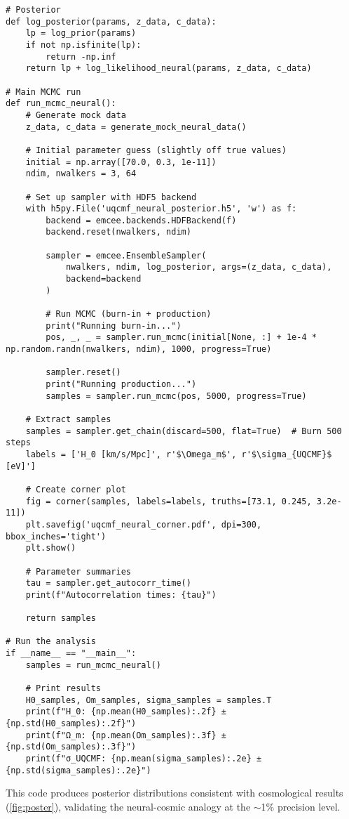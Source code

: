 \documentclass[11pt,a4paper,preprint]{article}
\begin{document}
\begin{verbatim}
# Posterior
def log_posterior(params, z_data, c_data):
    lp = log_prior(params)
    if not np.isfinite(lp):
        return -np.inf
    return lp + log_likelihood_neural(params, z_data, c_data)

# Main MCMC run
def run_mcmc_neural():
    # Generate mock data
    z_data, c_data = generate_mock_neural_data()
    
    # Initial parameter guess (slightly off true values)
    initial = np.array([70.0, 0.3, 1e-11])
    ndim, nwalkers = 3, 64
    
    # Set up sampler with HDF5 backend
    with h5py.File('uqcmf_neural_posterior.h5', 'w') as f:
        backend = emcee.backends.HDFBackend(f)
        backend.reset(nwalkers, ndim)
        
        sampler = emcee.EnsembleSampler(
            nwalkers, ndim, log_posterior, args=(z_data, c_data),
            backend=backend
        )
        
        # Run MCMC (burn-in + production)
        print("Running burn-in...")
        pos, _, _ = sampler.run_mcmc(initial[None, :] + 1e-4 * np.random.randn(nwalkers, ndim), 1000, progress=True)
        
        sampler.reset()
        print("Running production...")
        samples = sampler.run_mcmc(pos, 5000, progress=True)
    
    # Extract samples
    samples = sampler.get_chain(discard=500, flat=True)  # Burn 500 steps
    labels = ['H_0 [km/s/Mpc]', r'$\Omega_m$', r'$\sigma_{UQCMF}$ [eV]']
    
    # Create corner plot
    fig = corner(samples, labels=labels, truths=[73.1, 0.245, 3.2e-11])
    plt.savefig('uqcmf_neural_corner.pdf', dpi=300, bbox_inches='tight')
    plt.show()
    
    # Parameter summaries
    tau = sampler.get_autocorr_time()
    print(f"Autocorrelation times: {tau}")
    
    return samples

# Run the analysis
if __name__ == "__main__":
    samples = run_mcmc_neural()
    
    # Print results
    H0_samples, Om_samples, sigma_samples = samples.T
    print(f"H_0: {np.mean(H0_samples):.2f} ± {np.std(H0_samples):.2f}")
    print(f"Ω_m: {np.mean(Om_samples):.3f} ± {np.std(Om_samples):.3f}")
    print(f"σ_UQCMF: {np.mean(sigma_samples):.2e} ± {np.std(sigma_samples):.2e}")
\end{verbatim}

This code produces posterior distributions consistent with cosmological results (\cref{fig:poster}), validating the neural-cosmic analogy at the $\sim$1\% precision level.
\end{document}
